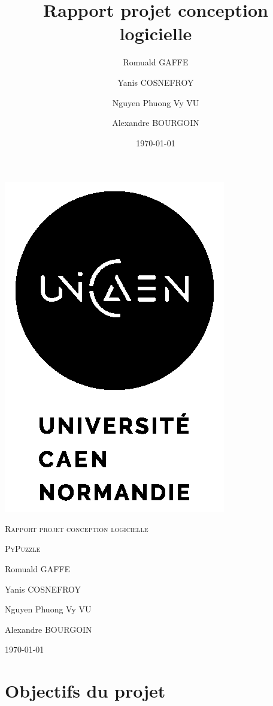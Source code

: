\documentclass[a4paper]{report}
\title{Rapport projet conception logicielle}
\author{Romuald GAFFE\and Yanis COSNEFROY\and Nguyen Phuong Vy VU\and Alexandre BOURGOIN}
\date{\today}
\begin{document}
\begin{titlepage}
    \centering
    \includegraphics{images/logounicaen.png}\par\vspace{1cm}
    {\scshape\LARGE Rapport projet conception logicielle \par}
    \vspace{1cm}
    {\scshape\Large PyPuzzle\par}
    \vspace{1cm}
	{\Large Romuald GAFFE\par}
	{\Large Yanis COSNEFROY\par}
	{\Large Nguyen Phuong Vy VU\par}
	{\Large Alexandre BOURGOIN\par}
    \vspace{1cm}
	{\large \today \par}
\end{titlepage}
\newpage

\tableofcontents

\newpage
\part{Objectifs du projet}
\end{document}
